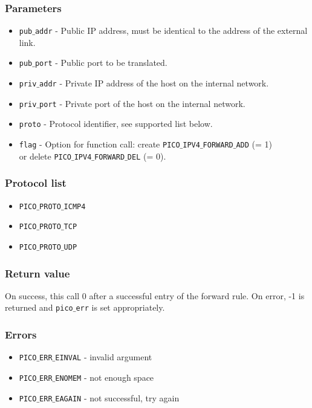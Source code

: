 \subsubsection*{Parameters}
\begin{itemize}[noitemsep]
\item \texttt{pub$\_$addr} - Public IP address, must be identical to the address of the external link.
\item \texttt{pub$\_$port} - Public port to be translated.
\item \texttt{priv$\_$addr} - Private IP address of the host on the internal network.
\item \texttt{priv$\_$port} - Private port of the host on the internal network.
\item \texttt{proto} - Protocol identifier, see supported list below.
\item \texttt{flag} - Option for function call: create \texttt{PICO$\_$IPV4$\_$FORWARD$\_$ADD} (= 1) \\
or delete \texttt{PICO$\_$IPV4$\_$FORWARD$\_$DEL} (= 0).
\end{itemize}

\subsubsection*{Protocol list}
\begin{itemize}[noitemsep]
\item \texttt{PICO$\_$PROTO$\_$ICMP4}
\item \texttt{PICO$\_$PROTO$\_$TCP}
\item \texttt{PICO$\_$PROTO$\_$UDP}
\end{itemize}

\subsubsection*{Return value}
On success, this call 0 after a successful entry of the forward rule.
On error, -1 is returned and \texttt{pico$\_$err} is set appropriately.

\subsubsection*{Errors}
\begin{itemize}[noitemsep]
\item \texttt{PICO$\_$ERR$\_$EINVAL} - invalid argument
\item \texttt{PICO$\_$ERR$\_$ENOMEM} - not enough space
\item \texttt{PICO$\_$ERR$\_$EAGAIN} - not successful, try again
\end{itemize}

